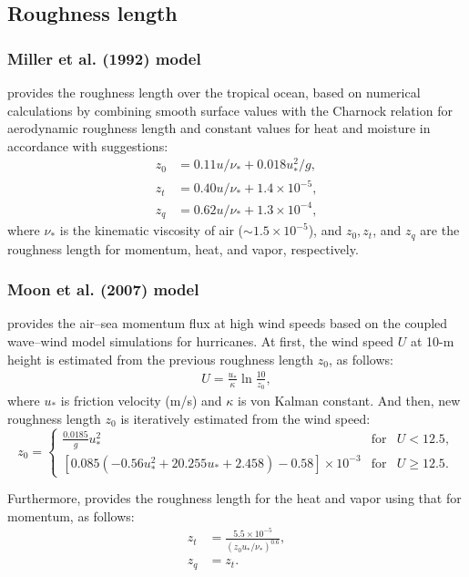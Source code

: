 \subsection{Roughness length}
\subsubsection{Miller et al. (1992) model}
\citet{miller_1992} provides the roughness length over the tropical ocean,
based on numerical calculations by combining smooth surface values
with the Charnock relation for aerodynamic roughness length
and constant values for heat and moisture in accordance with \citet{Smith_1988,Smith_1989} suggestions:
\begin{align}
  z_0 &= 0.11u/\nu_* + 0.018u_*^2/g, \label{eq: z_0} \\
  z_t &= 0.40u/\nu_* + 1.4 \times 10^{-5}, \label{eq: z_t} \\
  z_q &= 0.62u/\nu_* + 1.3 \times 10^{-4}, \label{eq: z_q}
\end{align}
where $\nu_*$ is the kinematic viscosity of air ($\sim 1.5 \times 10^{-5}$), and $z_0, z_t$,
and $z_q$ are the roughness length for momentum, heat, and vapor, respectively.

\subsubsection{Moon et al. (2007) model}
\citet{moon_2007} provides the air--sea momentum flux at high wind speeds
based on the coupled wave--wind model simulations for hurricanes.
At first, the wind speed $U$ at 10-m height is estimated from the previous roughness length $z_0$, as follows:
\begin{align}
  U =\frac{u_{*}}{\kappa} \ln \frac{10}{z_0},
\end{align}
where
$u_{*}$ is friction velocity (m/s)
and $\kappa$ is von Kalman constant.
And then, new roughness length $z_0$ is iteratively estimated from the wind speed:
\begin{equation}
  z_0   = \left\{
  \begin{array}{lll}
    \frac{0.0185}{g} u_{*}^2 & \mathrm{for} & U < 12.5, \\
    \left[ 0.085 \left( -0.56 u_{*}^2 + 20.255 u_{*} + 2.458 \right) - 0.58 \right] \times 10^{-3} & \mathrm{for} & U \ge 12.5.
   \end{array} \right.
\end{equation}

Furthermore, \citet{Fairall_2003} provides the roughness length for the heat and vapor
using that for momentum, as follows:
\begin{align}
  z_t &= \frac{ 5.5 \times 10^{-5} }{ ( z_0 u_{*} / \nu_{*} )^{0.6} }, \\
  z_q &= z_t.
\end{align}

